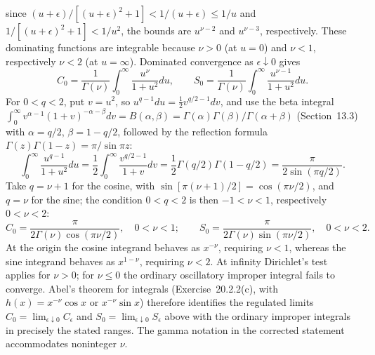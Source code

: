 since $(u+\epsilon)/[(u+\epsilon)^2+1]<1/(u+\epsilon)\le1/u$
and $1/[(u+\epsilon)^2+1]<1/u^2$, the bounds are
$u^{\nu-2}$ and $u^{\nu-3}$, respectively. These dominating
functions are integrable because $\nu>0$ (at $u=0$) and
$\nu<1$, respectively $\nu<2$ (at $u=\infty$). Dominated
convergence as $\epsilon\downarrow0$ gives
\[
C_0=\frac1{\Gamma(\nu)}\int_0^\infty\frac{u^\nu}{1+u^2}du,
\qquad
S_0=\frac1{\Gamma(\nu)}\int_0^\infty\frac{u^{\nu-1}}{1+u^2}du.
\]
For $0<q<2$, put $v=u^2$, so $u^{q-1}du=\frac12v^{q/2-1}dv$,
and use the beta integral
$\int_0^\infty v^{\alpha-1}(1+v)^{-\alpha-\beta}dv
=B(\alpha,\beta)=\Gamma(\alpha)\Gamma(\beta)/\Gamma(\alpha+\beta)$
(Section~13.3) with $\alpha=q/2$, $\beta=1-q/2$, followed by the
reflection formula $\Gamma(z)\Gamma(1-z)=\pi/\sin\pi z$:
\[
\int_0^\infty\frac{u^{q-1}}{1+u^2}du
=\frac12\int_0^\infty\frac{v^{q/2-1}}{1+v}dv
=\frac12\Gamma(q/2)\Gamma(1-q/2)
=\frac\pi{2\sin(\pi q/2)}.
\]
Take $q=\nu+1$ for the cosine, with
$\sin[\pi(\nu+1)/2]=\cos(\pi\nu/2)$, and $q=\nu$ for the sine;
the condition $0<q<2$ is then $-1<\nu<1$, respectively
$0<\nu<2$:
\[
\boxed{C_0=\frac\pi{2\Gamma(\nu)\cos(\pi\nu/2)}},\quad0<\nu<1;
\qquad
\boxed{S_0=\frac\pi{2\Gamma(\nu)\sin(\pi\nu/2)}},\quad0<\nu<2.
\]
At the origin the cosine integrand behaves as $x^{-\nu}$,
requiring $\nu<1$, whereas the sine integrand behaves as
$x^{1-\nu}$, requiring $\nu<2$. At infinity Dirichlet's test
applies for $\nu>0$; for $\nu\le0$ the ordinary oscillatory
improper integral fails to converge. Abel's theorem for
integrals (Exercise~20.2.2(c), with $h(x)=x^{-\nu}\cos x$ or
$x^{-\nu}\sin x$) therefore identifies the regulated limits
$C_0=\lim_{\epsilon\downarrow0}C_\epsilon$ and
$S_0=\lim_{\epsilon\downarrow0}S_\epsilon$ above with the
ordinary improper integrals in precisely the stated ranges.
The gamma notation in the corrected statement accommodates
noninteger $\nu$.

